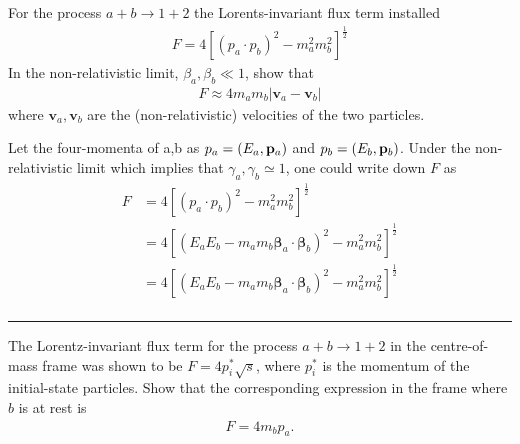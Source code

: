 \begin{problem}{3.7}
For the process $a+b\to1+2$ the Lorents-invariant flux term installed
\begin{align*}
    F = 4 \left[ \left( p_a \cdot p_b \right)^2 - m_a^2 m_b^2  \right]^{\frac{1}{2}}
\end{align*}
In the non-relativistic limit, $\beta_a,\beta_b \ll 1$, show that
\begin{align*}
    F \approx 4m_am_b \left| \mathbf{v}_a - \mathbf{v}_b \right|
\end{align*}
where $\mathbf{v}_a,\mathbf{v}_b$ are the (non-relativistic) velocities of the two particles.
\end{problem}
\begin{solution}
Let the four-momenta of a,b as $p_a = \left( E_a, \mathbf{p}_a\right)$ and $p_b = \left( E_b, \mathbf{p}_b\right)$.
Under the non-relativistic limit which implies that $\gamma_a,\gamma_b \simeq 1$, one could write down $F$ as
\begin{align*}
    F &=  4 \left[ \left( p_a \cdot p_b \right)^2 - m_a^2 m_b^2  \right]^{\frac{1}{2}} \\[0.15in]
      &=  4 \left[ \left( E_aE_b - m_am_b \boldsymbol{\beta}_a\cdot\boldsymbol{\beta}_b\right)^2 - m_a^2 m_b^2  \right]^{\frac{1}{2}} \\[0.15in]
      &=  4 \left[ \left( E_aE_b - m_am_b \boldsymbol{\beta}_a\cdot\boldsymbol{\beta}_b\right)^2 - m_a^2 m_b^2  \right]^{\frac{1}{2}} \\[0.15in]
\end{align*}
\end{solution} 
    
\noindent\rule{7in}{1.5pt}
    


\begin{problem}{3.8}
The Lorentz-invariant flux term for the process $a+b\to1+2$ in the centre-of-mass frame was shown to be 
$F=4p_i^\ast\sqrt{s}$, where $p_i^\ast$ is the momentum of the initial-state particles. Show that the 
corresponding expression in the frame where $b$ is at rest is 
\begin{align*}
    F = 4m_bp_a.
\end{align*}
\end{problem}
            
\begin{solution}
        
            
\end{solution} 
    
